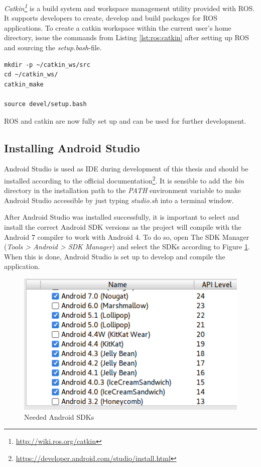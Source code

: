 \textit{Catkin\footnote{\url{http://wiki.ros.org/catkin}}} is a build system and workspace management utility provided with ROS. It supports developers to create, develop and build packages for ROS applications. To create a catkin workspace within the current user's home directory, issue the commands from Listing \ref{lst:ros:catkin} after setting up ROS and sourcing the \textit{setup.bash}-file.

\begin{minipage}{\linewidth}
	\begin{lstlisting}[caption={Setting up a catkin workspace},label=lst:ros:catkin]
mkdir -p ~/catkin_ws/src
cd ~/catkin_ws/
catkin_make

source devel/setup.bash
	\end{lstlisting}
\end{minipage}

ROS and catkin are now fully set up and can be used for further development.

\subsection{Installing Android Studio}

Android Studio is used as IDE during development of this thesis and should be installed according to the official documentation\footnote{\url{https://developer.android.com/studio/install.html}}. It is sensible to add the \textit{bin} directory in the installation path to the \textit{PATH} environment variable to make Android Studio accessible by just typing \textit{studio.sh} into a terminal window.

After Android Studio was installed successfully, it is important to select and install the correct Android SDK versions as the project will compile with the Android 7 compiler to work with Android 4. To do so, open The SDK Manager (\textit{Tools > Android > SDK Manager}) and select the SDKs according to Figure \ref{fig:android:sdk}. When this is done, Android Studio is set up to develop and compile the application.

\begin{figure}
	\caption{Needed Android SDKs\label{fig:android:sdk}}
	\begin{center}
		\includegraphics[scale=0.7]{assets/chpt_impl/sdks.PNG}
	\end{center}
\end{figure}

